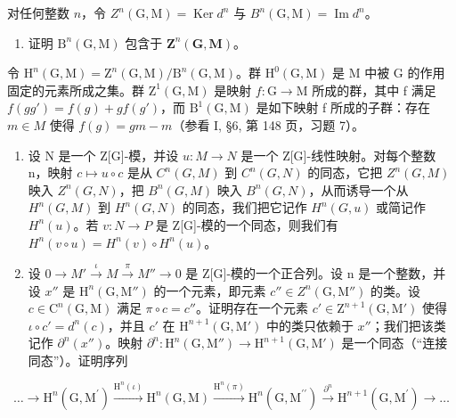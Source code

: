 对任何整数 \(n\)，令 \(Z^n(\mathrm{G},\mathrm{M}) = \operatorname{Ker} d^n\) 与 \(B^n(\mathrm{G},\mathrm{M}) = \operatorname{Im} d^n\)。

\begin{enumerate}
\def\labelenumi{\alph{enumi})}
\tightlist
\item
  证明 \(\mathrm{B}^n (\mathrm{G},\mathrm{M})\) 包含于 \(\mathbf{Z}^n (\mathbf{G},\mathbf{M})\)。
\end{enumerate}

令 \(\mathrm{H}^{n}(\mathrm{G},\mathrm{M})=\mathrm{Z}^{n}(\mathrm{G},\mathrm{M})/\mathrm{B}^{n}(\mathrm{G},\mathrm{M})\)。群 \(\mathrm{H}^{0}(\mathrm{G},\mathrm{M})\) 是 M 中被 G 的作用固定的元素所成之集。群 \(\mathrm{Z}^{1}(\mathrm{G},\mathrm{M})\) 是映射 \(f:\mathrm{G}\to\mathrm{M}\) 所成的群，其中 f 满足 \(f(gg')=f(g)+gf(g')\)，而 \(\mathrm{B}^{1}(\mathrm{G},\mathrm{M})\) 是如下映射 f 所成的子群：存在 \(m\in M\) 使得 \(f(g)=gm-m\)（参看 I, §6, 第 148 页，习题 7）。

\begin{enumerate}
\def\labelenumi{\alph{enumi})}
\setcounter{enumi}{1}
\item
  设 N 是一个 Z{[}G{]}-模，并设 \(u : M \to N\) 是一个 Z{[}G{]}-线性映射。对每个整数 n，映射 \(c \mapsto u \circ c\) 是从 \(C^{n}(G, M)\) 到 \(C^{n}(G, N)\) 的同态，它把 \(Z^{n}(G, M)\) 映入 \(Z^{n}(G, N)\)，把 \(B^{n}(G, M)\) 映入 \(B^{n}(G, N)\)，从而诱导一个从 \(H^{n}(G, M)\) 到 \(H^{n}(G, N)\) 的同态，我们把它记作 \(H^{n}(G, u)\) 或简记作 \(H^{n}(u)\)。若 \(v : N \to P\) 是 Z{[}G{]}-模的一个同态，则我们有 \(H^{n}(v \circ u) = H^{n}(v) \circ H^{n}(u)\)。
\item
  设 \(0 \to M' \xrightarrow{\iota} M \xrightarrow{\pi} M'' \to 0\) 是 Z{[}G{]}-模的一个正合列。设 n 是一个整数，并设 \(x''\) 是 \(\mathrm{H}^{n}(\mathrm{G},\mathrm{M}'')\) 的一个元素，即元素 \(c'' \in Z^{n}(\mathrm{G},\mathrm{M}'')\) 的类。设 \(c \in \mathrm{C}^{n}(\mathrm{G},\mathrm{M})\) 满足 \(\pi \circ c = c''\)。证明存在一个元素 \(c' \in \mathrm{Z}^{n+1}(\mathrm{G},\mathrm{M}')\) 使得 \(\iota \circ c' = d^{n}(c)\)，并且 \(c'\) 在 \(\mathrm{H}^{n+1}(\mathrm{G},\mathrm{M}')\) 中的类只依赖于 \(x''\)；我们把该类记作 \(\partial^{n}(x'')\)。映射 \(\partial^{n}: \mathrm{H}^{n}(\mathrm{G},\mathrm{M}'') \to \mathrm{H}^{n+1}(\mathrm{G},\mathrm{M}')\) 是一个同态（“连接同态”）。证明序列
\end{enumerate}

\[
\dots \longrightarrow \mathrm{H} ^ {n} (\mathrm{G}, \mathrm{M} ^ {\prime}) \stackrel {{\mathrm{H} ^ {n} (\iota)}} {{\longrightarrow}} \mathrm{H} ^ {n} (\mathrm{G}, \mathrm{M}) \stackrel {{\mathrm{H} ^ {n} (\pi)}} {{\longrightarrow}} \mathrm{H} ^ {n} (\mathrm{G}, \mathrm{M} ^ {\prime \prime}) \stackrel {{\partial^ {n}}} {{\longrightarrow}} \mathrm{H} ^ {n + 1} (\mathrm{G}, \mathrm{M} ^ {\prime}) \longrightarrow \dots
\]

